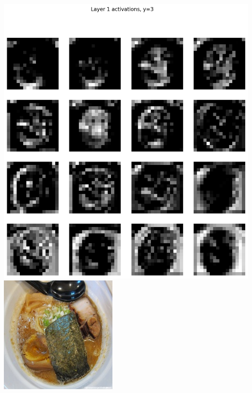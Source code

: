 \documentclass[11pt, answers]{exam}
\begin{document}
\begin{solution}
\begin{parts}
\begin{center}
      \includegraphics[scale=0.6]{CNN_viz1_3.png}
      \includegraphics[scale=0.3]{00000.jpg}

\end{center}
\end{parts}
\end{solution}
\end{document}
